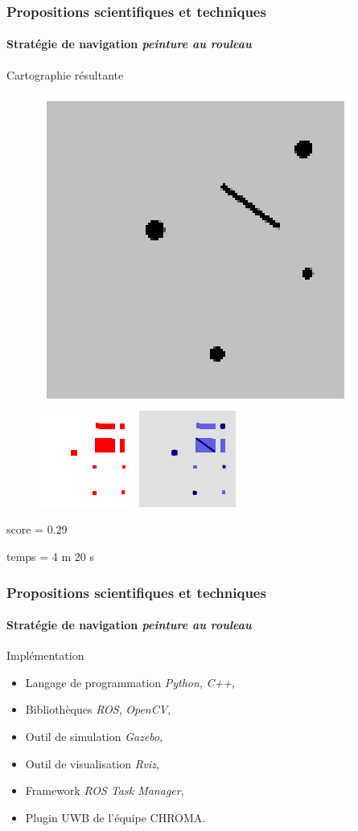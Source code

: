 \documentclass{beamer}
\begin{document}
			\begin{frame}
				\frametitle{Propositions scientifiques et techniques}
				\framesubtitle{Stratégie de navigation \textit{peinture au rouleau}}
				Cartographie résultante
				\begin{figure}
					\centering
					\includegraphics[width=0.3\linewidth]{graphics/test_05_flip.png}
					\includegraphics[width=0.3\linewidth]{graphics/occupancy_grid_example_par.png}
					\includegraphics[width=0.3\linewidth]{graphics/both_example_par.png}
				\end{figure}
				score = 0.29

				temps = 4 m 20 s
			\end{frame}
			\begin{frame}
				\frametitle{Propositions scientifiques et techniques}
				\framesubtitle{Stratégie de navigation \textit{peinture au rouleau}}
				Implémentation
				\begin{itemize}
					\item Langage de programmation \textit{Python}, \textit{C++},
					\item Bibliothèques \textit{ROS}, \textit{OpenCV},
					\item Outil de simulation \textit{Gazebo},
					\item Outil de visualisation \textit{Rviz},
					\item Framework \textit{ROS Task Manager},
					\item Plugin UWB de l'équipe CHROMA.
				\end{itemize}
			\end{frame}
\end{document}
